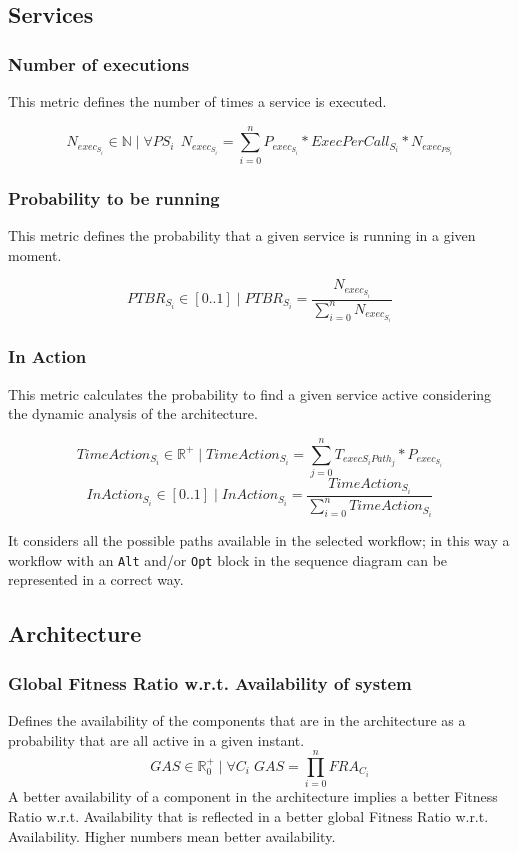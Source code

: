 \subsection{Services}
\subsubsection{Number of executions}
\label{met:ne}
This metric defines the number of times a service is executed.

\[ N_{exec_{S_i}} \in \mathbb{N} \; | \; \forall PS_i \;\, N_{exec_{S_i}} = \sum_{i=0}^{n} P_{exec_{S_i}} * ExecPerCall_{S_i} * N_{exec_{PS_i}} \]

\subsubsection{Probability to be running}
\label{met:ptbr}
This metric defines the probability that a given service is running in a given moment.

\[ PTBR_{S_i} \in [0..1] \; | \; PTBR_{S_i} =  \frac{{N_{exec_{S_i}}}}{ \sum_{i=0}^{n}  N_{exec_{S_i}}} \]

\subsubsection{In Action}
\label{met:ia}
This metric calculates the probability to find a given service active considering the dynamic analysis of the architecture.

\[ TimeAction_{S_i} \in \mathbb{R}^+ \; | \; TimeAction_{S_i}=\sum_{j=0}^{n} T_{exec{S_i}Path_j} * P_{exec_{S_i}} \]
\[ InAction_{S_i} \in [0..1] \; | \; InAction_{S_i} = \frac{TimeAction_{S_i}}{{\sum_{i=0}^n}TimeAction_{S_i}} \]

It considers all the possible paths available in the selected workflow; in this way a workflow with an \texttt{Alt} and/or \texttt{Opt} block in the sequence diagram can be represented in a correct way.

\subsection{Architecture}
\subsubsection{Global Fitness Ratio w.r.t. Availability of system}
\label{met:gfra}
Defines the availability of the components that are in the architecture as a probability that are all active in a given instant.
\[ GAS \in \mathbb{R}^+_0 \; | \; \forall C_i \; GAS = \prod_{i=0}^{n} FRA_{C_i} \]
A better availability of a component in the architecture implies a better Fitness Ratio w.r.t. Availability that is reflected in a better global Fitness Ratio w.r.t. Availability. Higher numbers mean better availability.
